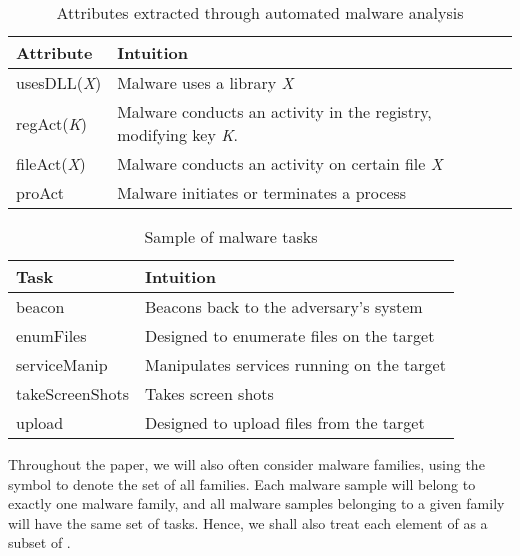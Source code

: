 \documentclass[conference]{IEEEtran}
\begin{document}
\vspace{-1em}
\begin{table}[h!]
	\caption{\textmd{Attributes extracted through automated malware analysis}}
	\label{exAt}
	\centering
	\renewcommand{\arraystretch}{1.5}
	
	\begin{tabular}{|p{2.3cm}|p{5cm}|} 
		\hline
		{\bf Attribute} &  {\bf Intuition} \\ \hline 
	
		\textsf{usesDLL(}\textit{X}\textsf{)} & Malware uses a library \textit{X}\\ \hline
		\textsf{regAct(}\textit{K}\textsf{)} & Malware conducts an activity in the registry, modifying key \textit{K}.\\ \hline
		\textsf{fileAct(}\textit{X}\textsf{)} & Malware conducts an activity on certain file \textit{X}\\ \hline
		\textsf{proAct} & Malware initiates or terminates a process\\ 
		\hline
	\end{tabular}
	\vspace{-1em}
	
\end{table}

\vspace{-1em}
\begin{table}[h!]
	\caption{\textmd{Sample of malware tasks}}
	\label{exTask}
	\centering
	\renewcommand{\arraystretch}{1.5}
	
	
	\begin{tabular}{|p{2.2cm}|p{5cm}|} 
		\hline
		{\bf Task} &  {\bf Intuition} \\ \hline 
		\textsf{beacon} & Beacons back to the adversary's system\\  \hline
		\textsf{enumFiles} & Designed to enumerate files on the target\\ \hline
		\textsf{serviceManip} & Manipulates services running on the target\\ \hline
		\textsf{takeScreenShots} & Takes screen shots\\ \hline
		\textsf{upload} & Designed to upload files from the target\\ 
		\hline
	\end{tabular}
	\vspace{-1em}
	
\end{table}

Throughout the paper, we will also often consider malware families, using the symbol  to denote the set of all families.  Each malware sample will belong to exactly one malware family, and all malware samples belonging to a given family will have the same set of tasks. Hence, we shall also treat each element of  as a subset of .
\end{document}
